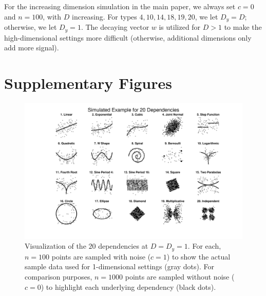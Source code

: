 \documentclass[11pt]{article}
\begin{document}
For the increasing dimension simulation in the main paper, we always set $c=0$ and $n=100$, with $D$ increasing.  For types  $4,10,14,18,19,20$, we let $D_y=D$; otherwise, we let $D_y=1$. 
The decaying vector $w$ is utilized for $D>1$ to make the high-dimensional settings more difficult (otherwise, additional dimensions only add more signal).

\clearpage

\section{Supplementary Figures}
\label{appen:figs}

\begin{figure}[htbp]
\includegraphics[trim={5cm 1.5cm 4cm 0.5cm},clip, width=1.0\textwidth]{Figures/FigSimVisual}
\caption{Visualization of the $20$ dependencies at $D=D_{y}=1$. For each, $n=100$ points are sampled with noise ($c=1$) to show the actual sample data used for 1-dimensional settings (gray dots). For comparison purposes, $n=1000$ points are sampled without noise ($c=0$) to highlight each underlying dependency (black dots).
}
\label{f:dependencies}
\end{figure}
\end{document}
